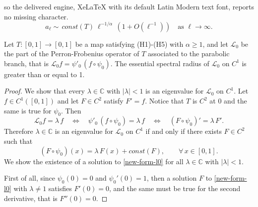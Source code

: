 \documentclass[10pt,a4paper]{amsart}
\newcommand{\C}{\mathbb C}
\newcommand{\LL}{\mathcal{L}}
\begin{document}
so the delivered engine, XeLaTeX with its default Latin Modern text font, reports no missing character.
\begin{equation}\label{asintotica-al}
a_\ell \sim \, const(T)\ \ell^{-1/\alpha}\, (1+O(\ell^{-1}))\quad \text{as $\ell \to \infty$.}
\end{equation}

\begin{proposition}\label{prop:l0-spec}
Let $T:[0,1]\to [0,1]$ be a map satisfying (H1)-(H5) with $\alpha\ge 1$, and let $\LL_0$ be the part of the Perron-Frobenius operator of $T$ associated to the parabolic branch, that is $\LL_0 f = \psi'_0 \, (f\circ \psi_0)$. The essential spectral radius of $\LL_0$ on $C^1$ is greater than or equal to 1.
\end{proposition}

\begin{proof}
We show that every $\lambda \in \C$ with $|\lambda|<1$ is an eigenvalue for $\LL_0$ on $C^1$. Let $f\in C^1([0,1])$ and let $F\in C^{2}$ satisfy $F'=f$. Notice that $T$ is $C^2$ at 0 and the same is true for $\psi_0$. Then
\[
\LL_0 f = \lambda \, f \quad \Leftrightarrow \quad \psi'_0 \, (f\circ \psi_0) = \lambda \, f \quad \Leftrightarrow \quad (F\circ \psi_0)' = \lambda\, F'.
\]
Therefore $\lambda \in \C$ is an eigenvalue for $\LL_0$ on $C^1$ if and only if there exists $F\in C^2$ such that
\begin{equation} \label{new-form-l0}
(F\circ \psi_0)(x) = \lambda\, F(x) + const(F),\qquad \forall\, x\in [0,1].
\end{equation}
We show the existence of a solution to \eqref{new-form-l0} for all $\lambda \in \C$ with $|\lambda|<1$.

First of all, since $\psi_0(0)=0$ and $\psi_0'(0)=1$, then a solution $F$ to \eqref{new-form-l0} with $\lambda\not=1$ satisfies $F'(0)=0$, and the same must be true for the second derivative, that is $F''(0)=0$. 


\end{proof}
\end{document}
